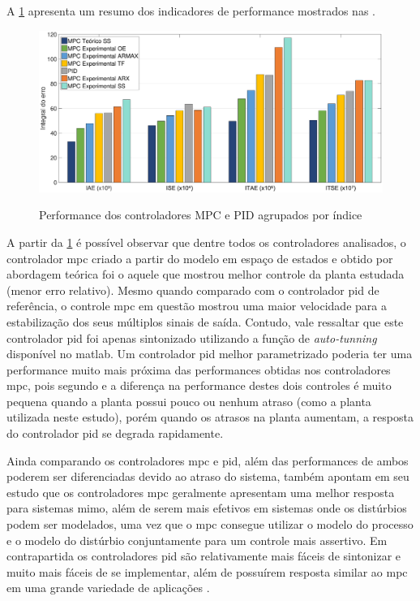 A \cref{fig:resultados_performance} apresenta um resumo dos indicadores de performance mostrados nas
. 

\begin{figure}[!h]
	\caption{Performance dos controladores MPC e PID agrupados por índice}
	\begin{center}
		\includegraphics[width=1.00\textwidth]{./5_images/ResultadosPerformance.eps} 
		\label{fig:resultados_performance}
	\end{center}
	\centering
\end{figure}

\clearpage

A partir da \cref{fig:resultados_performance} é possível observar que dentre todos os controladores analisados,
o controlador \acrshort{mpc} criado a partir do modelo em espaço de estados e obtido por abordagem teórica
foi o aquele que mostrou melhor controle da planta estudada (menor erro relativo). Mesmo quando comparado com o controlador 
\acrshort{pid} de referência, o controle \acrshort{mpc} em questão mostrou uma maior velocidade para a estabilização
dos seus múltiplos sinais de saída. Contudo, vale ressaltar que este controlador \acrshort{pid} 
foi apenas sintonizado utilizando a função de \textit{auto-tunning} disponível no \acrshort{matlab}.
Um controlador \acrshort{pid} melhor parametrizado poderia ter uma performance muito mais próxima das 
performances obtidas nos controladores \acrshort{mpc}, pois segundo  e
 a diferença na performance destes dois controles é muito pequena quando
a planta possui pouco ou nenhum atraso (como a planta utilizada neste estudo), porém quando os atrasos
na planta aumentam, a resposta do controlador \acrshort{pid} se degrada rapidamente.

Ainda comparando os controladores \acrshort{mpc} e \acrshort{pid}, além das performances de ambos poderem ser
diferenciadas devido ao atraso do sistema,  também apontam em seu estudo que os
controladores \acrshort{mpc} geralmente apresentam uma melhor resposta para sistemas \acrshort{mimo},
além de serem mais efetivos em sistemas onde os distúrbios podem ser modelados, uma vez que o
\acrshort{mpc} consegue utilizar o modelo do processo e o modelo do distúrbio conjuntamente para um 
controle mais assertivo. Em contrapartida os controladores \acrshort{pid} são relativamente mais
fáceis de sintonizar e muito mais fáceis de se implementar, além de possuírem resposta similar ao \acrshort{mpc}
em uma grande variedade de aplicações \cite{Taysom2017}.

